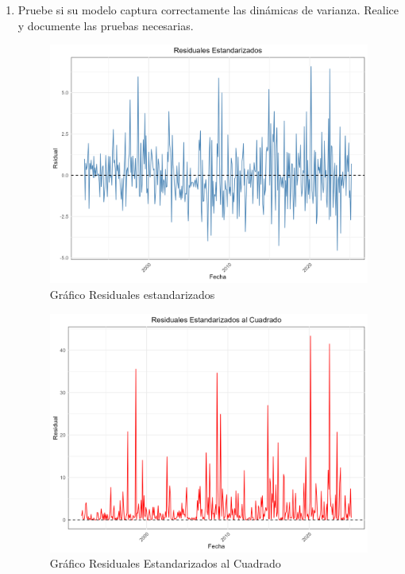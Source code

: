 \documentclass{article}
\theoremstyle{remark}
\theoremstyle{definition}
\begin{document}
\begin{enumerate}[label = \emph{\alph*})]
\begin{tcolorbox}[title=Soluci\'on 2.f]
            
        \end{tcolorbox}
    \item {Pruebe si su modelo captura correctamente las din\'amicas de varianza. Realice y documente las pruebas necesarias.}
        \begin{tcolorbox}[title=Soluci\'on 2.g]
            \begin{figure}[H]
                \centering
                \includegraphics[width=0.9\linewidth]{output/graf_resistd.png}
                \caption{Gr\'afico Residuales estandarizados}
                \label{fig:graf_residstd}
            \end{figure}

            \begin{figure}[H]
                \centering
                \includegraphics[width=0.9\linewidth]{output/graf_resistd2.png}
                \caption{Gr\'afico Residuales Estandarizados al Cuadrado}
                \label{fig:graf_residstd2}
            \end{figure}
            
            
            
        \end{tcolorbox}
\end{enumerate}
\end{document}
